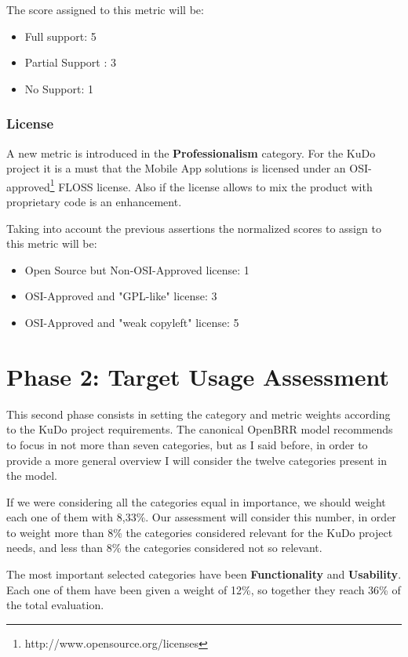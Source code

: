 \documentclass[a4paper,12pt]{book}
\begin{document}
The score assigned to this metric will be:
\begin{itemize}
 \item Full support: 5
  \item Partial Support : 3
 \item No Support: 1
\end{itemize}

\subsubsection{License}
\label{License}

A new metric is introduced in the \textbf{Professionalism} category. For the KuDo project it is a must that the Mobile App solutions is licensed under an OSI-approved\footnote{http://www.opensource.org/licenses} FLOSS license. Also if the license allows to mix the product with proprietary code is an enhancement.

Taking into account the previous assertions the normalized scores to assign to this metric will be:
\begin{itemize}
 \item Open Source but Non-OSI-Approved license: 1
 \item OSI-Approved and "GPL-like" license: 3
 \item OSI-Approved and "weak copyleft" license: 5
\end{itemize}

\section{Phase 2: Target Usage Assessment}
\label{sec:phase2}
This second phase consists in setting the category and metric weights according to the KuDo project requirements. The canonical OpenBRR model recommends to focus in not more than seven categories, but as I said before, in order to provide a more general overview I will consider the twelve categories present in the model.

If we were considering all the categories equal in importance, we should weight each one of them with 8,33\%. Our assessment will consider this number, in order to weight more than 8\% the categories considered relevant for the KuDo project needs, and less than 8\% the categories considered not so relevant.

The most important selected categories have been \textbf{Functionality} and \textbf{Usability}. Each one of them have been given a weight of 12\%, so together they reach 36\% of the total evaluation.
\end{document}
